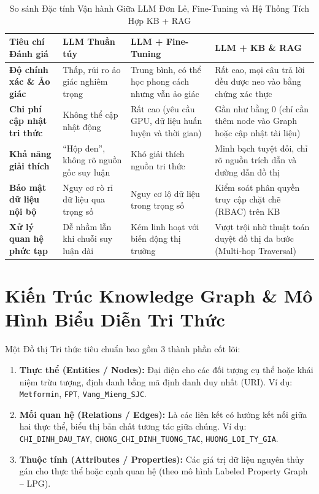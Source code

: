\documentclass[12pt,a4paper]{report}
\begin{document}
\begin{table}[H]
\centering
\small
\renewcommand{\arraystretch}{1.25}
\caption{So sánh Đặc tính Vận hành Giữa LLM Đơn Lẻ, Fine-Tuning và Hệ Thống Tích Hợp KB + RAG}
\label{tab:comparison_llm_rag}
\begin{tabularx}{\textwidth}{>{\RaggedRight\arraybackslash\bfseries}p{3.4cm} Y Y Y}
\toprule
\textbf{Tiêu chí Đánh giá} & \textbf{LLM Thuần túy} & \textbf{LLM + Fine-Tuning} & \textbf{LLM + KB \& RAG} \\
\midrule
Độ chính xác \& Ảo giác & Thấp, rủi ro ảo giác nghiêm trọng & Trung bình, có thể học phong cách nhưng vẫn ảo giác & Rất cao, mọi câu trả lời đều được neo vào bằng chứng xác thực \\
Chi phí cập nhật tri thức & Không thể cập nhật động & Rất cao (yêu cầu GPU, dữ liệu huấn luyện và thời gian) & Gần như bằng 0 (chỉ cần thêm node vào Graph hoặc cập nhật tài liệu) \\
Khả năng giải thích & “Hộp đen”, không rõ nguồn gốc suy luận & Khó giải thích nguồn tri thức & Minh bạch tuyệt đối, chỉ rõ nguồn trích dẫn và đường dẫn đồ thị \\
Bảo mật dữ liệu nội bộ & Nguy cơ rò rỉ dữ liệu qua trọng số & Nguy cơ lộ dữ liệu trong trọng số & Kiểm soát phân quyền truy cập chặt chẽ (RBAC) trên KB \\
Xử lý quan hệ phức tạp & Dễ nhầm lẫn khi chuỗi suy luận dài & Kém linh hoạt với biến động thị trường & Vượt trội nhờ thuật toán duyệt đồ thị đa bước (Multi-hop Traversal) \\
\bottomrule
\end{tabularx}
\end{table}

\section{Kiến Trúc Knowledge Graph \& Mô Hình Biểu Diễn Tri Thức}

Một Đồ thị Tri thức tiêu chuẩn bao gồm 3 thành phần cốt lõi:
\begin{enumerate}[leftmargin=1.2cm]
    \item \textbf{Thực thể (Entities / Nodes):} Đại diện cho các đối tượng cụ thể hoặc khái niệm trừu tượng, định danh bằng mã định danh duy nhất (URI). Ví dụ: \texttt{Metformin}, \texttt{FPT}, \texttt{Vang\_\allowbreak Mieng\_\allowbreak SJC}.
    \item \textbf{Mối quan hệ (Relations / Edges):} Là các liên kết có hướng kết nối giữa hai thực thể, biểu thị bản chất tương tác giữa chúng. Ví dụ: \texttt{CHI\_DINH\_DAU\_TAY}, \texttt{CHONG\_\allowbreak CHI\_\allowbreak DINH\_\allowbreak TUONG\_\allowbreak TAC}, \texttt{HUONG\_LOI\_TY\_GIA}.
    \item \textbf{Thuộc tính (Attributes / Properties):} Các giá trị dữ liệu nguyên thủy gán cho thực thể hoặc cạnh quan hệ (theo mô hình Labeled Property Graph -- LPG).
\end{enumerate}
\end{document}
